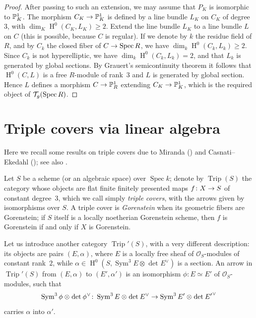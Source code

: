 \documentclass{amsart}
\numberwithin{equation}{section}
\numberwithin{subsection}{section}
\theoremstyle{definition}
\theoremstyle{remark}
\newcommand\cO{\mathcal{O}} \newcommand\cP{\mathcal{P}}
\newcommand\arr{\ifinner\to\else\longrightarrow\fi}
\renewcommand\H{\operatorname{H}}
\newcommand\spec{\operatorname{Spec}}
\newcommand\ddash{\nobreakdash--\hspace{0pt}}
\newcommand{\T}[1][g]{\cT_{#1}}
\newcommand{\trip}{\operatorname{Trip}}
\newcommand{\sym}{\operatorname{Sym}}
\newcommand{\symthree}[2][]{\sym^{3}_{{#1}}{#2} \otimes_{{#1}} \det\nolimits_{{#1}} {#2}\dual}
\newcommand{\dual}{^{\vee}}
\begin{document}
\begin{proof}
After passing to such an extension, we may assume that $P_{K}$ is isomorphic to $\mathbb{P}^{1}_{K}$. The morphism $C_{K} \arr \PP^{1}_{K}$ is defined by a line bundle $L_{K}$ on $C_{K}$ of degree~$3$, with $\dim_{K}\H^{0}(C_{K}, L_{K}) \geq 2$. Extend the line bundle $L_{K}$ to a line bundle $L$ on $C$ (this is possible, because $C$ is regular). If we denote by $k$ the residue field of $R$, and by $C_{k}$ the closed fiber of $C \arr \spec R$, we have $\dim_{k} \H^{0}(C_{k}, L_{k}) \geq 2$. Since $C_{k}$ is not hyperelliptic, we have $\dim_{k}\H^{0}(C_{k}, L_{k}) = 2$, and that $L_{k}$ is generated by global sections. By Grauert's semicontinuity theorem it follows that $\H^{0}(C, L)$ is a free $R$-module of rank~$3$ and $L$ is generated by global section. Hence $L$ defines a morphism $C \arr \PP^{1}_{R}$ extending $C_{K} \arr \PP^{1}_{K}$, which is the required object of $\T(\spec R)$.
\end{proof}



\section{Triple covers via linear algebra}\label{seclinalg}

Here we recall some results on triple covers due to Miranda (\cite{mir3}) and Casnati\ddash Ekedahl (\cite{caseke}); see also \cite{faesti}.

Let $S$ be a scheme (or an algebraic space) over $\spec k$; denote by $\trip(S)$ the category whose objects are flat finite finitely presented maps $f\colon X \arr S$ of constant degree~$3$, which we call simply \emph{triple covers}, with the arrows given by isomorphisms over $S$. A triple cover is \emph{Gorenstein} when its geometric fibers are Gorenstein; if $S$ itself is a locally noetherian Gorenstein scheme, then $f$ is Gorenstein if and only if $X$ is Gorenstein.

Let us introduce another category $\trip'(S)$, with a very different description: its objects are pairs $(E,\alpha)$, where $E$ is a locally free sheaf of $\cO_{S}$-modules of constant rank~$2$, while $\alpha\in\H^{0}(S,\symthree{E})$ is a section. An arrow in $\trip'(S)$ from $(E,\alpha)$ to $(E', \alpha')$ is an isomorphism $\phi \colon E \simeq E'$ of $\cO_{S}$-modules, such that
   \[
   \symthree\phi\colon \symthree E \arr \symthree{E'}
   \]
carries $\alpha$ into $\alpha'$.
\end{document}
